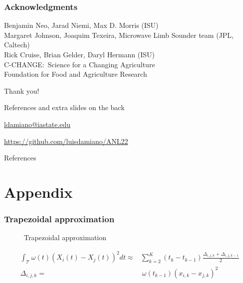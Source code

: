 \documentclass{snedecorbeamer}
\begin{document}
\begin{frame}[c]
  \frametitle{Acknowledgments}
  \centering

  {\small
    Benjamin Neo, Jarad Niemi, Max D. Morris (ISU) \\
    Margaret Johnson, Joaquim Texeira, Microwave Limb Sounder team
    (JPL, Caltech) \\
    Rick Cruise, Brian Gelder, Daryl Hermann (ISU) \\
    C-CHANGE:~Science for a Changing Agriculture \\
    Foundation for Food and Agriculture Research
  }

  \vfill

  {\huge Thank you!}

  \vfill

  {\tiny References and extra slides on the back}

  \href{ldamiano@iastate.edu}{
    ldamiano@iastate.edu}

  \href{https://github.com/luisdamiano/ANL22}{
https://github.com/luisdamiano/ANL22}
\end{frame}

\begin{frame}[allowframebreaks]{References}
  \tiny
  
  
\end{frame}

\section{Appendix}
\begin{frame}
  \frametitle{Trapezoidal approximation}

  \begin{figure}[h!]
    \centering
    \caption[]{Trapezoidal approximation}
  \end{figure}

  {
    \setlength{\abovedisplayskip}{-1cm}
    \begin{align}
      \int_{\mathcal{T}}
      \omega(t)
      {\left(X_i(t) - X_j(t) \right)}^2 dt
      \approx
      &
      \sum_{k = 2}^{K} {
      \left(t_{k} - t_{k - 1}\right)
      \frac{
      \Delta_{i, j, k} +
      \Delta_{i, j, k - 1}
      }{2}
      } \\
      \Delta_{i, j, k} =
      & \
      \omega(t_{k-1}) {\left(x_{i, k} - x_{j, k}\right)}^2
    \end{align}
  }

\end{frame}
\end{document}
